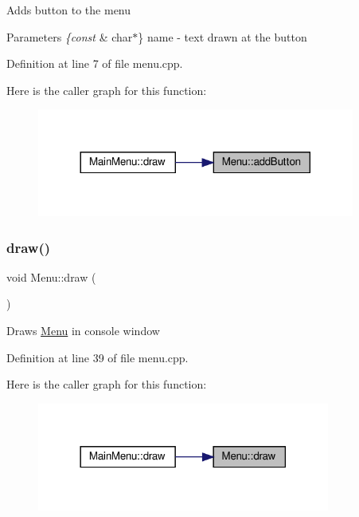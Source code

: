 Adds button to the menu 
\begin{DoxyParams}{Parameters}
{\em \{const} & char$\ast$\} name -\/ text drawn at the button \\
\hline
\end{DoxyParams}


Definition at line 7 of file menu.\+cpp.

Here is the caller graph for this function\+:
\nopagebreak
\begin{figure}[H]
\begin{center}
\leavevmode
\includegraphics[width=296pt]{class_menu_a1a1982871bb5f8b1557d26b0d9ccfe0f_icgraph}
\end{center}
\end{figure}
\mbox{\label{class_menu_a2cd7ab9901a8f42a3ae977d0774398a6}} 
\subsubsection{\texorpdfstring{draw()}{draw()}}
{\footnotesize\ttfamily void Menu\+::draw (\begin{DoxyParamCaption}{ }\end{DoxyParamCaption})}

Draws \mbox{\hyperlink{class_menu}{Menu}} in console window 

Definition at line 39 of file menu.\+cpp.

Here is the caller graph for this function\+:
\nopagebreak
\begin{figure}[H]
\begin{center}
\leavevmode
\includegraphics[width=273pt]{class_menu_a2cd7ab9901a8f42a3ae977d0774398a6_icgraph}
\end{center}
\end{figure}
\mbox{\label{class_menu_ac5ec365a1916cc9cbd233063544588d7}} 
